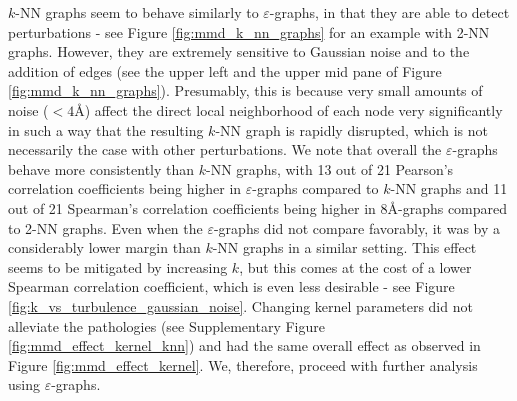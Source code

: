 $k$-NN graphs seem to behave similarly to $\varepsilon$-graphs, in that they are
able to detect perturbations - see Figure \ref{fig:mmd_k_nn_graphs} for an
example with 2-NN graphs. However, they are extremely sensitive to Gaussian
noise and to the addition of edges (see the upper left and the upper mid pane of Figure
\ref{fig:mmd_k_nn_graphs}). Presumably, this is because very small amounts of
noise ($<4$\si{\angstrom}) affect the direct local neighborhood of each node
very significantly in such a way that the resulting $k$-NN graph is rapidly
disrupted, which is not necessarily the case with other perturbations. We note
that overall the $\varepsilon$-graphs behave more consistently than $k$-NN
graphs, with 13 out of 21 Pearson's correlation coefficients being higher in
$\varepsilon$-graphs compared to $k$-NN graphs and 11 out of 21 Spearman's
correlation coefficients being higher in 8\si{\angstrom}-graphs compared to 2-NN
graphs. Even when the $\varepsilon$-graphs did not compare favorably, it was by
a considerably lower margin than $k$-NN graphs in a similar setting. This effect
seems to be mitigated by increasing $k$, but this comes at the cost of a lower
Spearman correlation coefficient, which is even less desirable - see Figure
\ref{fig:k_vs_turbulence_gaussian_noise}. Changing kernel parameters did not
alleviate the pathologies (see Supplementary Figure
\ref{fig:mmd_effect_kernel_knn}) and had the same overall effect as observed in
Figure \ref{fig:mmd_effect_kernel}. We, therefore, proceed with further analysis
using $\varepsilon$-graphs.


